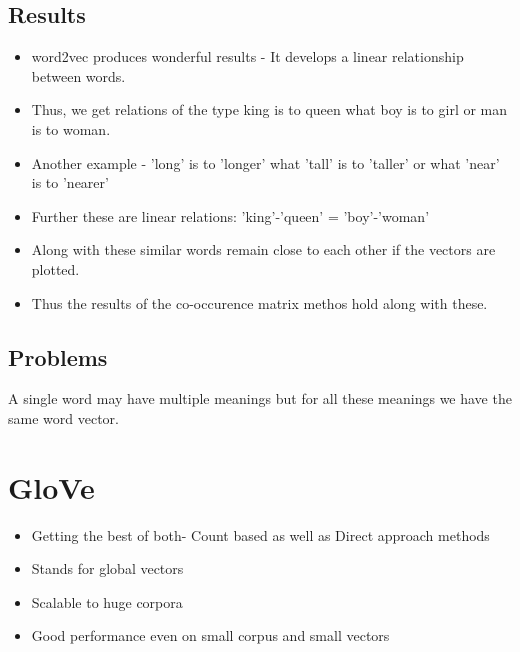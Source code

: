 \documentclass{article}
\begin{document}
\subsection{Results}
\begin{itemize} 
\item word2vec produces wonderful results - It develops a linear relationship between words.
\item Thus, we get relations of the type king is to queen what boy is to girl or man is to woman.
\item  Another example - 'long' is to 'longer' what 'tall' is to 'taller' or what 'near' is to 'nearer'
\item Further these are linear relations: 'king'-'queen' = 'boy'-'woman'
\item Along with these similar words remain close to each other if the vectors are plotted.
\item Thus the results of the co-occurence matrix methos hold along with these.
\end{itemize}

\subsection{Problems}
\hspace{10pt}A single word may have multiple meanings but for all these meanings we have the same word vector.

\section{GloVe}
\begin{itemize}
\item  Getting the best of both- Count based as well as Direct approach methods
\item  Stands for global vectors
\item  Scalable to huge corpora
\item Good performance even on small corpus and small vectors
\end{itemize}
\end{document}
